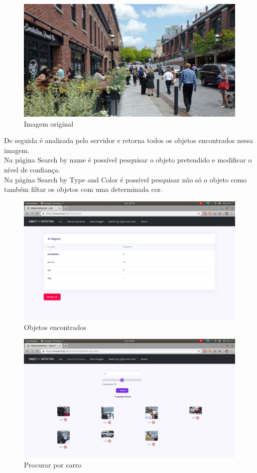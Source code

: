 \documentclass{report}
\begin{document}
\begin{figure}[!ht]
    \centering
    \includegraphics[scale = 0.3]{UrbanDesign.jpg}
    \caption{Imagem original}
    \label{fig:original}
\end{figure}
\vspace{5mm}
De seguida é analisada pelo servidor e retorna todos os objetos encontrados nessa imagem.\\
Na página Search by name é possível pesquisar o objeto pretendido e modificar o nível de confiança.\\
Na página Search by Type and Color é possível pesquisar não só o objeto como também filtar os objetos com uma determinada cor.
\begin{figure}[!ht]
    \centering
    \includegraphics[scale = 0.3]{list.png}
    \caption{Objetos encontrados}
    \label{fig:listadeobjetos}
\end{figure}
\vspace{5mm}
\begin{figure}[!ht]
    \centering
    \includegraphics[scale = 0.3]{search.png}
    \caption{Procurar por carro}
    \label{fig:search}
\end{figure}
\end{document}
